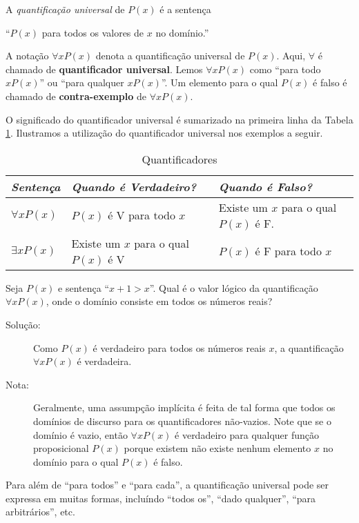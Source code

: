 \begin{defn}
\label{def19}
A \emph{quantificação universal} de $P(x)$ é a sentença
\begin{center}``$P(x)$ para todos os valores de $x$ no domínio.''\end{center}
A notação $\forall xP(x)$ denota a quantificação universal de $P(x)$. Aqui,
$\forall$ é chamado de \textbf{quantificador universal}. Lemos $\forall xP(x)$
como ``para todo $xP(x)$'' ou ``para qualquer $xP(x)$''. Um elemento para o qual
$P(x)$ é falso é chamado de \textbf{contra-exemplo} de $\forall xP(x)$.
\end{defn}

O significado do quantificador universal é sumarizado na primeira linha da
Tabela \ref{tab117}. Ilustramos a utilização do quantificador universal nos
exemplos a seguir.

\begin{table}[H]
\centering
\begin{tabular}{|l|l|l|}%
\toprule
\textbf{\emph{Sentença}} & \textbf{\emph{Quando é Verdadeiro?}} &
\textbf{\emph{Quando é Falso?}}\\
\midrule
$\forall xP(x)$ & $P(x)$ é V para todo $x$	& Existe um $x$ para o
qual $P(x)$ é F.\\
$\exists xP(x)$ & Existe um $x$ para o qual $P(x)$ é V & $P(x)$ é F
para todo $x$\\
\bottomrule%
\end{tabular}%
\caption{Quantificadores}
\label{tab117}
\end{table}

\begin{exmp}
\label{exem133}
Seja $P(x)$ e sentença ``$x + 1>x$''. Qual é o valor lógico da quantificação
$\forall xP(x)$, onde o domínio consiste em todos os números reais?
\end{exmp}
\begin{description}
\item[Solução:] Como $P(x)$ é verdadeiro para todos os números reais $x$, a
quantificação $\forall xP(x)$ é verdadeira.
\item[Nota:] Geralmente, uma assumpção implícita é feita de tal forma que todos
os domínios de discurso para os quantificadores não-vazios. Note que se o
domínio é vazio, então $\forall xP(x)$ é verdadeiro para qualquer função
proposicional $P(x)$ porque existem não existe nenhum elemento $x$ no domínio
para o qual $P(x)$ é falso.
\end{description}

Para além de ``para todos'' e ``para cada'', a quantificação universal pode ser
expressa em muitas formas, incluíndo ``todos os'', ``dado qualquer'', ``para
arbitrários'', etc.

